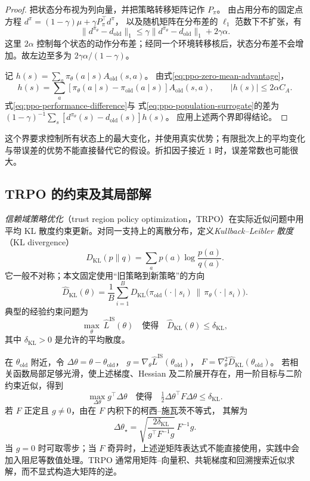 \documentclass[UTF8,12pt,a4paper,fontset=fandol]{ctexart}
\begin{document}
\begin{proof}
把状态分布视为列向量，并把策略转移矩阵记作 $P_\pi$。
由占用分布的固定点方程
$d^\pi=(1-\gamma)\mu+\gamma P_\pi^\top d^\pi$，
以及随机矩阵在分布差的 $\ell_1$ 范数下不扩张，有
\[
  \|d^{\pi_\theta}-d_{\mathrm{old}}\|_1
  \le\gamma\|d^{\pi_\theta}-d_{\mathrm{old}}\|_1+2\gamma\alpha.
\]
这里 $2\alpha$ 控制每个状态的动作分布差；经同一个环境转移核后，状态分布差不会增加。故左边至多为 $2\gamma\alpha/(1-\gamma)$。

记 $h(s)=\sum_a\pi_\theta(a\mid s)A_{\mathrm{old}}(s,a)$。
由式\eqref{eq:ppo-zero-mean-advantage}，
\[
  h(s)=\sum_a
  [\pi_\theta(a\mid s)-\pi_{\mathrm{old}}(a\mid s)]
  A_{\mathrm{old}}(s,a),
  \qquad |h(s)|\le2\alpha C_A.
\]
式\eqref{eq:ppo-performance-difference}与
式\eqref{eq:ppo-population-surrogate}的差为
$(1-\gamma)^{-1}\sum_s[d^{\pi_\theta}(s)-d_{\mathrm{old}}(s)]h(s)$。
应用上述两个界即得结论。
\end{proof}

这个界要求控制所有状态上的最大变化，并使用真实优势；有限批次上的平均变化与带误差的优势不能直接替代它的假设。折扣因子接近 $1$ 时，误差常数也可能很大。

\subsection{TRPO 的约束及其局部解}

\emph{信赖域策略优化}（trust region policy optimization，TRPO）在实际近似问题中用平均 KL 散度约束更新。对同一支持上的离散分布，定义\emph{Kullback--Leibler 散度}（KL divergence）
\[
  D_{\mathrm{KL}}(p\|q)=\sum_a p(a)\log\frac{p(a)}{q(a)}.
\]
它一般不对称；本文固定使用“旧策略到新策略”的方向
\[
  \widehat D_{\mathrm{KL}}(\theta)
  =\frac1B\sum_{i=1}^B
  D_{\mathrm{KL}}\bigl(\pi_{\mathrm{old}}(\cdot\mid s_i)
                      \,\|\,\pi_\theta(\cdot\mid s_i)\bigr).
\]
典型的经验约束问题为
\begin{equation}
  \max_\theta\ \widehat L^{\mathrm{IS}}(\theta)
  \quad\text{使得}\quad
  \widehat D_{\mathrm{KL}}(\theta)\le\delta_{\mathrm{KL}},
  \label{eq:ppo-trpo}
\end{equation}
其中 $\delta_{\mathrm{KL}}>0$ 是允许的平均散度。

在 $\theta_{\mathrm{old}}$ 附近，令
$\Delta\theta=\theta-\theta_{\mathrm{old}}$，
$g=\nabla_\theta\widehat L^{\mathrm{IS}}(\theta_{\mathrm{old}})$，
$F=\nabla_\theta^2\widehat D_{\mathrm{KL}}(\theta_{\mathrm{old}})$。
若相关函数局部足够光滑，使上述梯度、Hessian 及二阶展开存在，用一阶目标与二阶约束近似，得到
\[
  \max_{\Delta\theta}g^\top\Delta\theta
  \quad\text{使得}\quad
  \tfrac12\Delta\theta^\top F\Delta\theta\le\delta_{\mathrm{KL}}.
\]
若 $F$ 正定且 $g\ne0$，由在 $F$ 内积下的柯西--施瓦茨不等式，
其解为
\[
  \Delta\theta_\star=
  \sqrt{\frac{2\delta_{\mathrm{KL}}}{g^\top F^{-1}g}}\,
  F^{-1}g.
\]
当 $g=0$ 时可取零步；当 $F$ 奇异时，上述逆矩阵表达式不能直接使用，实践中会加入阻尼等数值处理。TRPO 通常用矩阵--向量积、共轭梯度和回溯搜索近似求解，而不显式构造大矩阵的逆。
\end{document}

